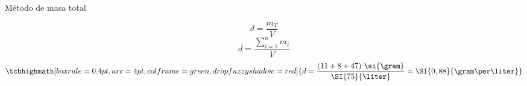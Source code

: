 \begin{frame}
{        \begin{exampleblock}{Método de masa total}
            \begin{overprint}
                    $$
                        d = \frac{m_T}{V}
                    $$                    
                    $$
                        d = \frac{\sum_{i=1}^{n}m_i}{V}
                    $$
                    $$
                        \tcbhighmath[boxrule=0.4pt,arc=4pt,colframe=green,drop fuzzy shadow=red]{d = \frac{(11+8+47)~\si{\gram}}{\SI{75}{\liter}} = \SI{0,88}{\gram\per\liter}}
                    $$
            \end{overprint}
        \end{exampleblock}
               }
\end{frame}


